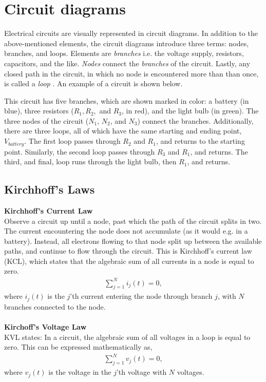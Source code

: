 \section{Circuit diagrams}
Electrical circuits are visually represented in circuit diagrams. In addition to the above-mentioned elements, the circuit diagrams introduce three terms: nodes, branches, and loops. Elements are \textit{branches} i.e.  the voltage supply, resistors, capacitors, and the like. \textit{Nodes} connect the \textit{branches} of the circuit. Lastly, any closed path in the circuit, in which no node is encountered more than than once, is called a \textit{loop} \cite[page~32]{bcircuit}. An example of a circuit is shown below.

\begin{figure}[H]
 
\end{figure}

This circuit has five branches, which are shown marked in color: a battery (in blue), three resistors ($R_1, R_2,$ and $R_3$, in red), and the light bulb (in green). The three nodes of the circuit ($N_1$, $N_2$, and $N_3$) connect the branches. Additionally, there are three loops, all of which have the same starting and ending point, $V_{battery}$. The first loop passes through $R_2$ and $R_1$, and returns to the starting point. Similarly, the second loop passes through $R_3$ and $R_1$, and returns. The third, and final, loop runs through the light bulb, then $R_1$, and returns. 

\subsection{Kirchhoff's Laws}
\textbf{Kirchhoff's Current Law}
\\
Observe a circuit up until a node, past which the path of the circuit splits in two. The current encountering the node does not accumulate (as it would e.g. in a battery). Instead, all electrons flowing to that node split up between the available paths, and continue to flow through the circuit. This is Kirchhoff’s current law (KCL), which states that the algebraic sum of all currents in a node is equal to zero. 
\begin{align}
\sum_{j=1}^{N} i_{j}(t) = 0,
\end{align}
where $i_{j}(t)$ is the $j$'th current entering the node through branch $j$, with $N$ branches connected to the node. \cite[page~32]{bcircuit}
\\
\\
\textbf{Kirchoff's Voltage Law}
\\
KVL states: In a circuit, the algebraic sum of all voltages in a loop is equal to zero. This can be expressed mathematically  as,
\begin{align}
\sum_{j=1}^{N} v_{j}(t) = 0,
\end{align}
where $v_{j}(t)$ is the voltage in the $j$'th voltage with $N$ voltages.\citep[page~34]{bcircuit}\\

